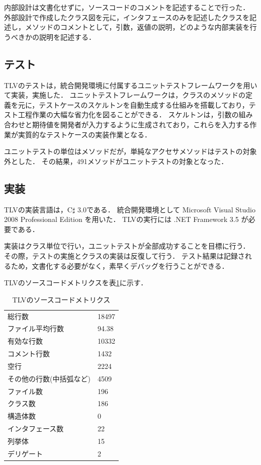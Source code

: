 内部設計は文書化せずに，ソースコードのコメントを記述することで行った．
外部設計で作成したクラス図を元に，インタフェースのみを記述したクラスを記述し，メソッドのコメントとして，引数，返値の説明，どのような内部実装を行うべきかの説明を記述する．

\subsection{テスト}

TLVのテストは，統合開発環境に付属するユニットテストフレームワークを用いて実装，実施した．
ユニットテストフレームワークは，クラスのメソッドの定義を元に，テストケースのスケルトンを自動生成する仕組みを搭載しており，テスト工程作業の大幅な省力化を図ることができる．
スケルトンは，引数の組み合わせと期待値を開発者が入力するように生成されており，これらを入力する作業が実質的なテストケースの実装作業となる．

ユニットテストの単位はメソッドだが，単純なアクセサメソッドはテストの対象外とした．
その結果，491メソッドがユニットテストの対象となった．

\subsection{実装}

TLVの実装言語は，C$\sharp$ 3.0である．
統合開発環境として Microsoft Visual Studio 2008 Professional Edition を用いた．
TLVの実行には .NET Framework 3.5 が必要である．

実装はクラス単位で行い，ユニットテストが全部成功することを目標に行う．
その際，テストの実施とクラスの実装は反復して行う．
テスト結果は記録されるため，文書化する必要がなく，素早くデバッグを行うことができる．

TLVのソースコードメトリクスを表\ref{sourceMetrics}に示す．

\begin{table}[htb]
\begin{center}
\caption{TLVのソースコードメトリクス}
\label{sourceMetrics}
\begin{tabular}{l|l}
\hline
総行数              & 18497 \\
ファイル平均行数    & 94.38 \\
有効な行数          & 10332 \\
コメント行数        & 1432 \\
空行                & 2224 \\
その他の行数(中括弧など) & 4509 \\
ファイル数          & 196 \\
クラス数            & 186 \\
構造体数            & 0 \\
インタフェース数    & 22 \\
列挙体              & 15 \\
デリゲート          & 2 \\
\hline
\end{tabular}
\end{center}
\end{table}

